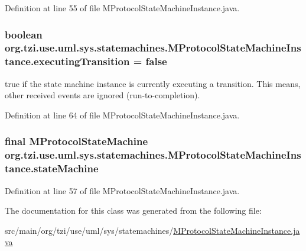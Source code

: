 Definition at line 55 of file M\-Protocol\-State\-Machine\-Instance.\-java.

\hypertarget{classorg_1_1tzi_1_1use_1_1uml_1_1sys_1_1statemachines_1_1_m_protocol_state_machine_instance_aca38770f89c09828112d7996118fc85c}{
\subsubsection[{executing\-Transition}]{\setlength{\rightskip}{0pt plus 5cm}boolean org.\-tzi.\-use.\-uml.\-sys.\-statemachines.\-M\-Protocol\-State\-Machine\-Instance.\-executing\-Transition = false\hspace{0.3cm}{\ttfamily [protected]}}}\label{classorg_1_1tzi_1_1use_1_1uml_1_1sys_1_1statemachines_1_1_m_protocol_state_machine_instance_aca38770f89c09828112d7996118fc85c}
{\ttfamily true} if the state machine instance is currently executing a transition. This means, other received events are ignored (run-\/to-\/completion). 

Definition at line 64 of file M\-Protocol\-State\-Machine\-Instance.\-java.

\hypertarget{classorg_1_1tzi_1_1use_1_1uml_1_1sys_1_1statemachines_1_1_m_protocol_state_machine_instance_a09539f4401e525af4779585bc31addfa}{
\subsubsection[{state\-Machine}]{\setlength{\rightskip}{0pt plus 5cm}final {\bf M\-Protocol\-State\-Machine} org.\-tzi.\-use.\-uml.\-sys.\-statemachines.\-M\-Protocol\-State\-Machine\-Instance.\-state\-Machine\hspace{0.3cm}{\ttfamily [protected]}}}\label{classorg_1_1tzi_1_1use_1_1uml_1_1sys_1_1statemachines_1_1_m_protocol_state_machine_instance_a09539f4401e525af4779585bc31addfa}


Definition at line 57 of file M\-Protocol\-State\-Machine\-Instance.\-java.



The documentation for this class was generated from the following file\-:\begin{DoxyCompactItemize}
\item 
src/main/org/tzi/use/uml/sys/statemachines/\hyperlink{_m_protocol_state_machine_instance_8java}{M\-Protocol\-State\-Machine\-Instance.\-java}\end{DoxyCompactItemize}
